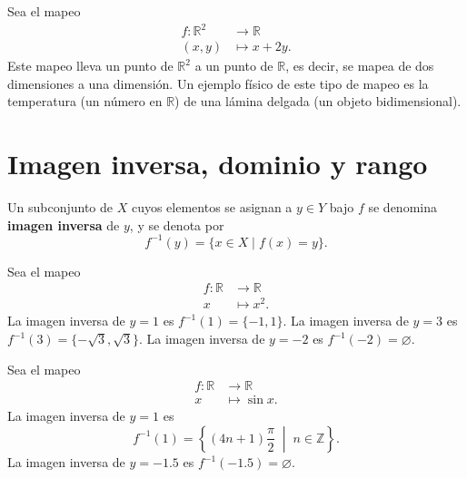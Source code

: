 \begin{ejemplo}
Sea el mapeo
\[
\begin{aligned}
f : \mathbb{R}^2 &\to \mathbb{R} \\
(x,y) &\mapsto x + 2y .
\end{aligned}
\]
Este mapeo lleva un punto de $\mathbb{R}^2$ a un punto de $\mathbb{R}$, es
decir, se mapea de dos dimensiones a una dimensión. Un ejemplo físico de este
tipo de mapeo es la temperatura (un número en $\mathbb{R}$) de una lámina
delgada (un objeto bidimensional).
\end{ejemplo}

\section{Imagen inversa, dominio y rango}

\begin{definicion}
Un subconjunto de $X$ cuyos elementos se asignan a $y \in Y$ bajo $f$ se
denomina \textbf{imagen inversa} de $y$, y se denota por
\[
f^{-1}(y) = \{x \in X \mid f(x) = y\}.
\]
\end{definicion}

\begin{center}
\end{center}

\begin{ejemplo}
Sea el mapeo
\[
\begin{aligned}
f : \mathbb{R} &\to \mathbb{R} \\
x &\mapsto x^2 .
\end{aligned}
\]
La imagen inversa de $y=1$ es $f^{-1}(1) = \{-1,1\}$. La imagen inversa de
$y=3$ es $f^{-1}(3) = \{-\sqrt{3},\sqrt{3}\}$. La imagen inversa de $y=-2$ es
$f^{-1}(-2) = \varnothing$.
\end{ejemplo}

\begin{ejemplo}
Sea el mapeo
\[
\begin{aligned}
f : \mathbb{R} &\to \mathbb{R} \\
x &\mapsto \sin x .
\end{aligned}
\]
La imagen inversa de $y=1$ es
\[
f^{-1}(1) = \left\{ (4n+1)\frac{\pi}{2} \; \middle| \; n \in \mathbb{Z} \right\}.
\]
La imagen inversa de $y=-1.5$ es $f^{-1}(-1.5) = \varnothing$.
\end{ejemplo}

